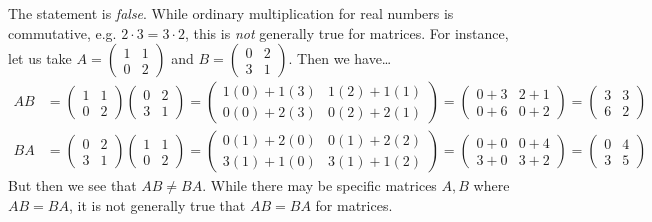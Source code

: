 \documentclass[11pt,letterpaper]{article}
\begin{document}
\sol The statement is \textit{false}. While ordinary multiplication for real numbers is commutative, e.g. $2 \cdot 3= 3 \cdot 2$, this is \textit{not} generally true for matrices. For instance, let us take $A= \begin{pmatrix} 1 & 1 \\ 0 & 2 \end{pmatrix}$ and $B= \begin{pmatrix} 0 & 2 \\ 3 & 1 \end{pmatrix}$. Then we have\dots
	\[
	\begin{aligned}
	AB&= \begin{pmatrix} 1 & 1 \\ 0 & 2 \end{pmatrix} \begin{pmatrix} 0 & 2 \\ 3 & 1 \end{pmatrix}= \begin{pmatrix} 1(0) + 1(3) & 1(2) + 1(1) \\ 0(0) + 2(3) & 0(2) + 2(1) \end{pmatrix}= \begin{pmatrix} 0 + 3 & 2 + 1 \\ 0 + 6 & 0 + 2 \end{pmatrix}= \begin{pmatrix} 3 & 3 \\ 6 & 2 \end{pmatrix} \\[0.3cm]
	BA&= \begin{pmatrix} 0 & 2 \\ 3 & 1 \end{pmatrix} \begin{pmatrix} 1 & 1 \\ 0 & 2 \end{pmatrix}= \begin{pmatrix} 0(1) + 2(0) & 0(1) + 2(2) \\ 3(1) + 1(0) & 3(1) + 1(2) \end{pmatrix}= \begin{pmatrix} 0 + 0 & 0 + 4 \\ 3 + 0 & 3 + 2 \end{pmatrix}= \begin{pmatrix} 0 & 4 \\ 3 & 5 \end{pmatrix}
	\end{aligned}
	\] 
But then we see that $AB \neq BA$. While there may be specific matrices $A, B$ where $AB= BA$, it is not generally true that $AB= BA$ for matrices. \pvspace{1.1cm}
\end{document}
